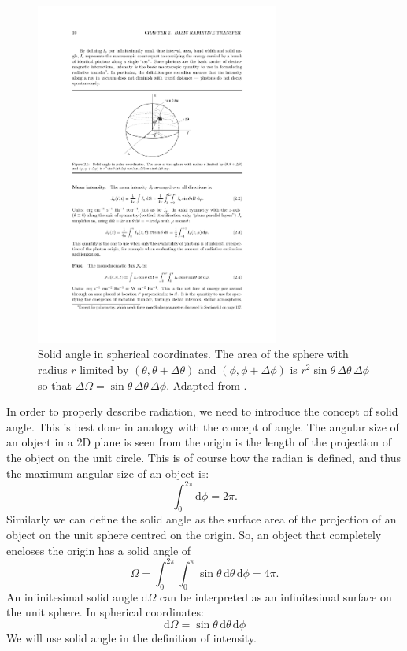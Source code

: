 \documentclass[12pt]{article}
\numberwithin{equation}{section}
\def\dd{\mathrm{d}}
\newcommand{\be}{\begin{equation}}
\newcommand{\ee}{\end{equation}}
\begin{document}
\begin{figure}
  \centering
  \includegraphics[width=8cm]{figs/fig_solid_angle}
  \caption{Solid angle in spherical coordinates. The area of the sphere with radius $r$ limited by $(\theta,\theta +\Delta\theta)$ and $(\phi,\phi +\Delta\phi)$ is $r^2 \sin{\theta} \, \Delta\theta \, \Delta\phi$ so that $\Delta \Omega = \sin{\theta}\, \Delta\theta \, \Delta\phi$. Adapted from \citet{2003rtsa.book.....R}.
  \label{fig:solid_angle}}
\end{figure}

In order to properly describe radiation, we need to introduce the concept of solid angle. This is best done in analogy with the concept of angle. The angular size of an object in a 2D plane is seen from the origin is the length of the projection of the object on the unit circle. This is of course how the radian is defined, and thus the maximum angular size of an object is:
\begin{equation}
\int_0^{2\pi} \dd \phi = 2\pi.
\end{equation}
Similarly we can define the solid angle as the surface area of the projection of an object on the unit sphere centred on the origin. So, an object that completely encloses the origin has a solid angle of
\be
\Omega = \int_0^{2\pi} \int_0^\pi \sin \theta \, \dd \theta\, \dd \phi = 4 \pi.
\ee
An infinitesimal solid angle $\dd \Omega$ can be interpreted as an infinitesimal surface on the unit sphere. In spherical coordinates:
\be
\dd \Omega = \sin \theta \,  \dd \theta \,  \dd \phi
\ee
We will use solid angle in the definition of intensity.
\end{document}
